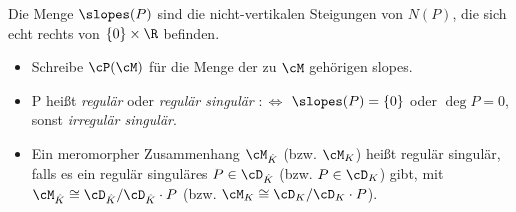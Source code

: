 \begin{defn} %
Die Menge $\slopes(P)$ sind die nicht-vertikalen Steigungen von $N(P)$, die
sich echt rechts von $\{0\}\times\R$ befinden.\\ %
\begin{itemize}
\item Schreibe $\cP(\cM)$ für die Menge der zu $\cM$ gehörigen slopes.
\item P heißt \emph{regulär} oder \emph{regulär singulär} $:\Leftrightarrow$
$\slopes(P)=\{0\}$ oder $\deg P=0$, sonst \emph{irregulär singulär}.
\item Ein meromorpher Zusammenhang $\cM_{\hat K}$ (bzw. $\cM_K$) heißt regulär
singulär, falls es ein regulär singuläres $P\in \cD_{\hat K}$ (bzw. $P\in
\cD_K$) gibt, mit $\cM_{\hat K}\cong\cD_{\hat K}/\cD_{\hat K}\cdot P$ (bzw.
$\cM_K\cong\cD_K/\cD_K\cdot P$).
\end{itemize}
\end{defn}
\begin{comment}
\begin{defn}[Alternative Definition]
\cite[Def 5.1.6]{hotta2007d}
We say a meromorphic connection $(\cM,\nabla)$ at $x=0$ is \emph{regular} if
there exists a finitely generated $\cO$-submodule $\cL\subset \cM$ which is
stable by the action of $\theta=x\nabla$ (i.e., $\theta \cL\subset\cL$) and
generates $\cM$ over $K$. We call such an $\cO$-submodule $\cL$ an
$\cO$-lattice of $(\cM,\nabla)$.
\end{defn}
\end{comment}

